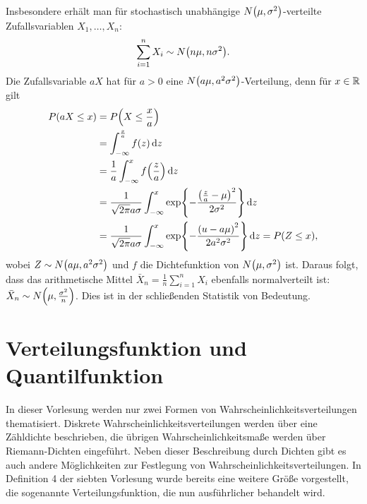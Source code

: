 \documentclass{lecture}
\begin{document}
\begin{example}
\begin{enumerate}
            Insbesondere erhält man für stochastisch unabhängige \(N\parentheses*{\mu, \sigma^2}\)-verteilte Zufallsvariablen \(X_1, \ldots, X_n\):
            \[
                \sum_{i = 1}^n X_i \sim N\parentheses*{n\mu, n\sigma^2}.
            \]
            Die Zufallsvariable \(aX\) hat für \(a > 0\) eine \(N\parentheses*{a\mu, a^2 \sigma^2}\)-Verteilung, denn für \(x \in \mathbb{R}\) gilt
            \begin{align*}
                P\parentheses*{aX \le x} &= P\parentheses*{X \le \frac{x}{a}}\\
                &= \int_{-\infty}^{\frac{x}{a}}f\parentheses*{z}\d z\\
                &= \frac{1}{a}\int_{-\infty}^x f\parentheses*{\frac{z}{a}}\d z\\
                &= \frac{1}{\sqrt{2\pi}a\sigma}\int_{-\infty}^x \exp\braces*{-\frac{\parentheses*{\frac{z}{a} - \mu}^2}{2\sigma^2}}\d z\\
                &= \frac{1}{\sqrt{2\pi}a\sigma}\int_{-\infty}^x \exp\braces*{-\frac{\parentheses*{u - a\mu}^2}{2a^2 \sigma^2}}\d z = P\parentheses*{Z \le x},
            \end{align*}
            wobei \(Z \sim N\parentheses*{a\mu, a^2 \sigma^2}\) und \(f\) die Dichtefunktion von \(N\parentheses*{\mu, \sigma^2}\) ist.
            Daraus folgt, dass das arithmetische Mittel \(\bar{X}_n = \frac{1}{n}\sum_{i = 1}^n X_i\) ebenfalls normalverteilt ist: \(\bar{X}_n \sim N\parentheses*{\mu, \frac{\sigma^2}{n}}\).
            Dies ist in der schließenden Statistik von Bedeutung.
        \end{enumerate}
    \end{example}


    \section*{Verteilungsfunktion und Quantilfunktion}

    In dieser Vorlesung werden nur zwei Formen von Wahrscheinlichkeitsverteilungen thematisiert.
    Diskrete Wahrscheinlichkeitsverteilungen werden über eine Zähldichte beschrieben, die übrigen Wahrscheinlichkeitsmaße werden über Riemann-Dichten eingeführt.
    Neben dieser Beschreibung durch Dichten gibt es auch andere Möglichkeiten zur Festlegung von Wahrscheinlichkeitsverteilungen.
    In Definition 4 der siebten Vorlesung wurde bereits eine weitere Größe vorgestellt, die sogenannte Verteilungsfunktion, die nun ausführlicher behandelt wird.
\end{document}

